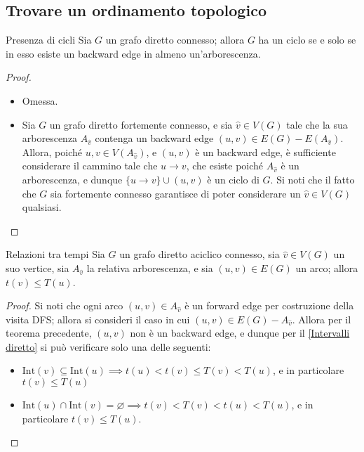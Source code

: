 \documentclass[a4paper, 12pt]{report}
\begin{document}
    \subsection{Trovare un ordinamento topologico}

    \begin{framedthm}[label={Cicli diretto}]{Presenza di cicli}
        Sia $G$ un grafo diretto connesso; allora $G$ ha un ciclo se e solo se in esso esiste un backward edge in almeno un'arborescenza.
    \end{framedthm}

    \begin{proof}
        \hspace{0.7cm}
        \begin{itemize}
            \item[]  Omessa.
            \item[]  Sia $G$ un grafo diretto fortemente connesso, e sia $\hat v \in V(G)$ tale che la sua arborescenza $A_{\hat v}$ contenga un backward edge $(u, v) \in E(G) - E(A_{\hat v})$. Allora, poiché $u, v \in V(A_{\hat v})$, e $(u, v)$ è un backward edge, è sufficiente considerare il cammino tale che $u \rightarrow v$, che esiste poiché $A_{\hat v}$ è un arborescenza, e dunque $\{u \rightarrow v\} \cup (u, v)$ è un ciclo di $G$. Si noti che il fatto che $G$ sia fortemente connesso garantisce di poter considerare un $\hat v \in V(G)$ qualsiasi.
        \end{itemize}
    \end{proof}

    \begin{framedcor}{Relazioni tra tempi}
        Sia $G$ un grafo diretto aciclico connesso, sia $\hat v \in V(G)$ un suo vertice, sia $A_{\hat v}$ la relativa arborescenza, e sia $(u, v) \in E(G)$ un arco; allora $t(v) \le T(u)$.
    \end{framedcor}

    \begin{proof}
        Si noti che ogni arco $(u, v) \in A_{\hat v}$ è un forward edge per costruzione della visita DFS; allora si consideri il caso in cui $(u, v) \in E(G) - A_{\hat v}$. Allora per il teorema precedente, $(u, v)$ non è un backward edge, e dunque per il \cref{Intervalli diretto} si può verificare solo una delle seguenti:
        \begin{itemize}
            \item $\mathrm{Int}(v) \subseteq \mathrm{Int}(u) \implies t(u) < t(v) \le T(v) < T(u)$, e in particolare $t(v) \le T(u)$
            \item $\mathrm{Int}(u) \cap \mathrm{Int}(v) = \varnothing \implies t(v) < T(v) < t(u) < T(u)$, e in particolare $t(v) \le T(u)$.
        \end{itemize}
    \end{proof}
\end{document}
